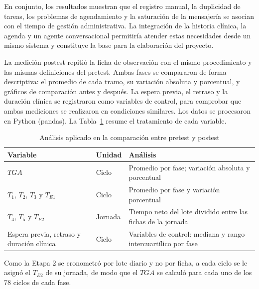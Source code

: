 
En conjunto, los resultados muestran que el registro manual, la duplicidad de tareas, los problemas de agendamiento y la saturación de la mensajería se asocian con el tiempo de gestión administrativa. La integración de la historia clínica, la agenda y un agente conversacional permitiría atender estas necesidades desde un mismo sistema y constituye la base para la elaboración del proyecto.

La medición postest repitió la ficha de observación con el mismo procedimiento y las mismas definiciones del pretest. Ambas fases se compararon de forma descriptiva: el promedio de cada tramo, su variación absoluta y porcentual, y gráficos de comparación antes y después. La espera previa, el retraso y la duración clínica se registraron como variables de control, para comprobar que ambas mediciones se realizaron en condiciones similares. Los datos se procesaron en Python (pandas). La Tabla~\ref{tab:analisis_postest} resume el tratamiento de cada variable.

\begin{table}[H]
\centering
\caption{Análisis aplicado en la comparación entre pretest y postest}
\label{tab:analisis_postest}
\fontsize{9}{11}\selectfont
\renewcommand{\arraystretch}{1.2}
\setlength{\tabcolsep}{4pt}
\begin{tabularx}{\linewidth}{|>{\raggedright\arraybackslash}p{3.6cm}|>{\raggedright\arraybackslash}p{2.0cm}|>{\raggedright\arraybackslash}X|}
\hline
\textbf{Variable} & \textbf{Unidad} & \textbf{Análisis} \\ \hline
$TGA$ & Ciclo & Promedio por fase; variación absoluta y porcentual \\ \hline
$T_1$, $T_2$, $T_3$ y $T_{E1}$ & Ciclo & Promedio por fase y variación porcentual \\ \hline
$T_4$, $T_5$ y $T_{E2}$ & Jornada & Tiempo neto del lote dividido entre las fichas de la jornada \\ \hline
Espera previa, retraso y duración clínica & Ciclo & Variables de control: mediana y rango intercuartílico por fase \\ \hline
\end{tabularx}
\end{table}

Como la Etapa 2 se cronometró por lote diario y no por ficha, a cada ciclo se le asignó el $T_{E2}$ de su jornada, de modo que el $TGA$ se calculó para cada uno de los 78 ciclos de cada fase.
